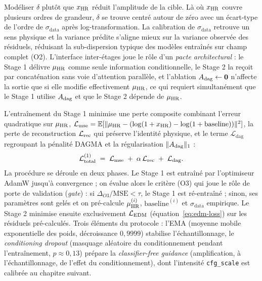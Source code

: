 Modéliser $\delta$ plutôt que $x_{\text{HR}}$ réduit l'amplitude de la cible. Là où $x_{\text{HR}}$ couvre plusieurs ordres de grandeur, $\delta$ se trouve centré autour de zéro avec un écart-type de l'ordre de $\sigma_{\mathrm{data}}$ après log-transformation. La calibration de $\sigma_{\mathrm{data}}$ retrouve un sens physique et la variance prédite s'aligne mieux sur la variance observée des résiduels, réduisant la sub-dispersion typique des modèles entraînés sur champ complet (O2). L'interface inter-étages joue le rôle d'un \emph{pacte architectural} : le Stage 1 délivre $\mu_{\text{HR}}$ comme seule information conditionnelle, le Stage 2 la reçoit par concaténation sans voie d'attention parallèle, et l'ablation $A_{\mathrm{dag}} \leftarrow \mathbf{0}$ n'affecte la sortie que si elle modifie effectivement $\mu_{\text{HR}}$, ce qui requiert simultanément que le Stage 1 utilise $A_{\mathrm{dag}}$ et que le Stage 2 dépende de $\mu_{\text{HR}}$.

\label{sec:oracle-pertes}

L'entraînement du Stage 1 minimise une perte composite combinant l'erreur quadratique sur $\mu_{\text{HR}}$, $\mathcal{L}_{\mathrm{mse}} = \mathbb{E}[\Vert \mu_{\text{HR}} - (\log(1+x_{\text{HR}}) - \log(1+\mathrm{baseline}))\Vert^2]$, la perte de reconstruction $\mathcal{L}_{\mathrm{rec}}$ qui préserve l'identité physique, et le terme $\mathcal{L}_{\mathrm{dag}}$ regroupant la pénalité DAGMA et la régularisation $\|A_{\mathrm{dag}}\|_1$ :
\begin{equation}
  \mathcal{L}_{\mathrm{total}}^{(1)} \;=\; \mathcal{L}_{\mathrm{mse}} \;+\; \alpha\, \mathcal{L}_{\mathrm{rec}} \;+\; \mathcal{L}_{\mathrm{dag}}.
  \label{eq:loss-total-stage1}
\end{equation}
La procédure se déroule en deux phases. Le Stage 1 est entraîné par l'optimiseur AdamW jusqu'à convergence ; on évalue alors le critère (O3) qui joue le rôle de porte de validation (\emph{gate}) : si $\Delta_{O3}/\mathrm{MSE} < \tau$, le Stage 1 est ré-entraîné ; sinon, ses paramètres sont gelés et on pré-calcule $\mu_{\text{HR}}^{(i)}$, $\mathrm{baseline}^{(i)}$ et $\sigma_{\mathrm{data}}$ empirique. Le Stage 2 minimise ensuite exclusivement $\mathcal{L}_{\mathrm{EDM}}$ (équation~\ref{eq:edm-loss}) sur les résiduels pré-calculés. Trois éléments du protocole : l'EMA (moyenne mobile exponentielle des poids, décroissance $0{,}9999$) stabilise l'échantillonnage, le \emph{conditioning dropout} (masquage aléatoire du conditionnement pendant l'entraînement, $p \approx 0{,}13$) prépare la \emph{classifier-free guidance} (amplification, à l'échantillonnage, de l'effet du conditionnement), dont l'intensité \texttt{cfg\_scale} est calibrée au chapitre suivant.

